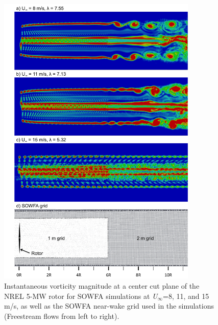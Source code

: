 \begin{figure}[htbp]
\centering
 \includegraphics[width=0.85\textwidth]{Figures/ch5Figures/VortSlice_multSpeed}%
 \caption{ Instantaneous vorticity magnitude at a center cut plane of the NREL 5-MW rotor  for SOWFA simulations at \emph{U$_\infty$}=8, 11, and 15 m/s, as well as the SOWFA near-wake grid used in the simulations (Freestream flows from left to right).}
 \label{vortMag_multSpeed}
\end{figure}   




